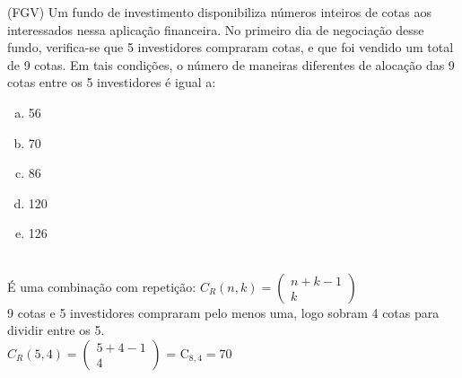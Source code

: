 \begin{ex}
(FGV) Um fundo de investimento disponibiliza números inteiros de cotas aos interessados nessa aplicação financeira. No primeiro dia de negociação desse fundo, verifica-se que 5 investidores compraram cotas, e que foi vendido um total de 9 cotas. Em tais condições, o número de maneiras diferentes de alocação das 9 cotas entre os 5 investidores é igual a:
   \begin{enumerate}[(a)]
   \item 56
   \item 70
   \item 86
   \item 120
   \item 126
   \end{enumerate}
     \begin{sol}
      \phantom{A} \\
É uma combinação com repetição: 
$ C_R(n,k)=
\left (
\begin{array}{c}
n+k-1 \\
k
\end{array}
\right )
$ \\
9 cotas e 5 investidores compraram  pelo menos uma, logo sobram 4 cotas para dividir entre os 5. \\
$C_R(5,4)=
\left(
\begin{array}  {c}
5+4-1 \\
4
\end{array}
\right)
$ = $\mathrm{C}_{8,4}=70$
      
      

     \end{sol}
\end{ex}